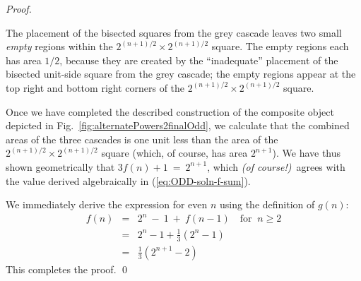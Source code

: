 \begin{proof}
\begin{enumerate}
\begin{enumerate}
\smallskip

The placement of the bisected squares from the grey cascade leaves two small {\em empty} regions within the $2^{(n+1)/2} \times 2^{(n+1)/2}$ square.  The empty regions each has area $1/2$, because they are created by the ``inadequate'' placement of the bisected unit-side
square from the grey cascade; the empty regions appear at the top right and bottom right corners of the $2^{(n+1)/2} \times 2^{(n+1)/2}$ square.
  \end{enumerate}
\end{enumerate}

Once we have completed the described construction of the composite object depicted in Fig.~\ref{fig:alternatePowers2finalOdd}, we calculate that the combined areas of the three cascades is one unit less than the area of the $2^{(n+1)/2} \times 2^{(n+1)/2}$ square (which, of course, has area $2^{n+1}$).  We have thus shown geometrically that $3 f(n)+1 \ = \ 2^{n+1}$, which {\em (of course!)}~agrees with the value derived algebraically in
(\ref{eq:ODD-soln-f-sum}).

\bigskip

We immediately derive the expression for even $n$ using the definition of $g(n)$:
\begin{eqnarray*}
f(n) & = & 2^n \ - \ 1 \ + \ f(n-1) \ \ \ \mbox{ for } \ n \geq 2 \\
       & = & 2^n -1 + \frac{1}{3} \left(2^{n} - 1 \right) \\
       & = &  \frac{1}{3} \left(2^{n+1} - 2 \right)
\end{eqnarray*}
This completes the proof.  \qed
\end{proof}


